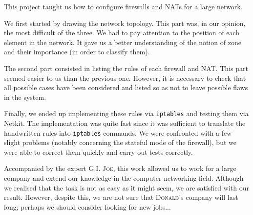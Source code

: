 \documentclass[a4paper, 12pt]{article}
\begin{document}
    This project taught us how to configure firewalls and NATs for a large network.
    
    We first started by drawing the network topology. This part was, in our opinion, the most difficult of the three. We had to pay attention to the position of each element in the network. It gave us a better understanding of the notion of zone and their importance (in order to classify them).
    
    The second part consisted in listing the rules of each firewall and NAT. This part seemed easier to us than the previous one. However, it is necessary to check that all possible cases have been considered and listed so as not to leave possible flaws in the system.
    
    Finally, we ended up implementing these rules via \texttt{iptables} and testing them via Netkit. The implementation was quite fast since it was sufficient to translate the handwritten rules into \texttt{iptables} commands. We were confronted with a few slight problems (notably concerning the stateful mode of the firewall), but we were able to correct them quickly and carry out tests correctly.

    Accompanied by the expert \textsc{G.I. Joe}, this work allowed us to work for a large company and extend our knowledge in the computer networking field. Although we realised that the task is not as easy as it might seem, we are satisfied with our result. However, despite this, we are not sure that \textsc{Donald}'s company will last long; perhaps we should consider looking for new jobs...
\end{document}
